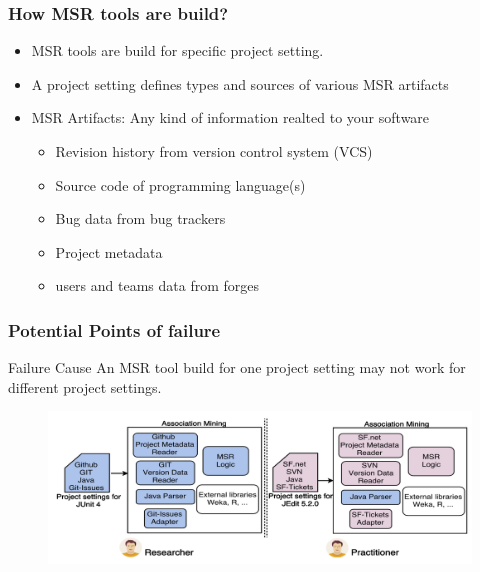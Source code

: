                 \begin{frame}
                    \frametitle{How MSR tools are build?}
                    \begin{itemize}
                        \item MSR tools are build for specific project setting.
                        \item A project setting defines types and sources of various MSR artifacts
                        \item MSR Artifacts: Any kind of information realted to your software
                        \begin{itemize}
                            \item Revision history from version control system (VCS)
                            \item Source code of programming language(s)
                            \item Bug data from bug trackers
                            \item Project metadata
                            \item users and teams data from forges
                        \end{itemize}
                    \end{itemize}
                \end{frame}


        \begin{frame}
            \frametitle{Potential Points of failure}
            \begin{alertblock}{Failure Cause}
                An MSR tool build for one project setting may not work for different project settings.
            \end{alertblock}
             \begin{figure}
                \centering
                    \includegraphics[width=0.85\linewidth]{figures/adoptingreserch.png}
             \end{figure}
        \end{frame}

